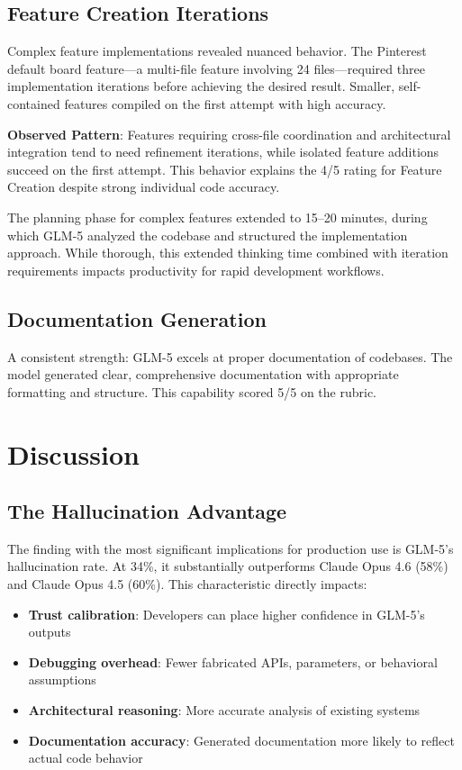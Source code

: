 \documentclass[conference]{IEEEtran}
\begin{document}
\subsection{Feature Creation Iterations}
Complex feature implementations revealed nuanced behavior. The Pinterest default board feature---a multi-file feature involving 24 files---required three implementation iterations before achieving the desired result. Smaller, self-contained features compiled on the first attempt with high accuracy.

\textbf{Observed Pattern}: Features requiring cross-file coordination and architectural integration tend to need refinement iterations, while isolated feature additions succeed on the first attempt. This behavior explains the 4/5 rating for Feature Creation despite strong individual code accuracy.

The planning phase for complex features extended to 15--20 minutes, during which GLM-5 analyzed the codebase and structured the implementation approach. While thorough, this extended thinking time combined with iteration requirements impacts productivity for rapid development workflows.

\subsection{Documentation Generation}
A consistent strength: GLM-5 excels at proper documentation of codebases. The model generated clear, comprehensive documentation with appropriate formatting and structure. This capability scored 5/5 on the rubric.

\section{Discussion}

\subsection{The Hallucination Advantage}
The finding with the most significant implications for production use is GLM-5's hallucination rate. At 34\%, it substantially outperforms Claude Opus 4.6 (58\%) and Claude Opus 4.5 (60\%). This characteristic directly impacts:

\begin{itemize}
    \item \textbf{Trust calibration}: Developers can place higher confidence in GLM-5's outputs
    \item \textbf{Debugging overhead}: Fewer fabricated APIs, parameters, or behavioral assumptions
    \item \textbf{Architectural reasoning}: More accurate analysis of existing systems
    \item \textbf{Documentation accuracy}: Generated documentation more likely to reflect actual code behavior
\end{itemize}
\end{document}
